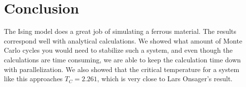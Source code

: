 \documentclass[../main.tex]{subfiles}
\begin{document}
\section{Conclusion}
The Ising model does a great job of simulating a ferrous material. The results correspond well with analytical calculations. We showed what amount of Monte Carlo cycles you would need to stabilize such a system, and even though the calculations are time consuming, we are able to keep the calculation time down with parallelization. We also showed that the critical temperature for a system like this approaches $T_C = 2.261$, which is very close to Lars Onsager's result.
\end{document}
